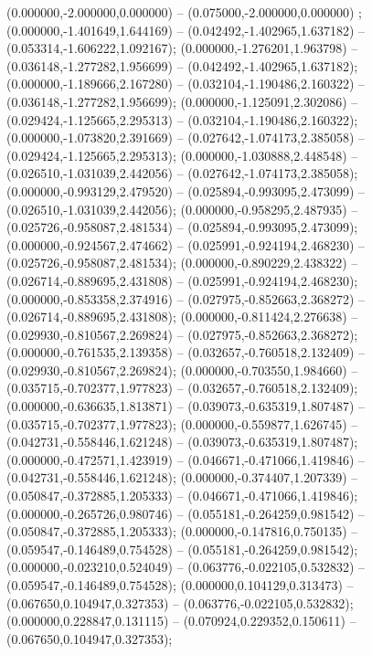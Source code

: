  (0.000000,-2.000000,0.000000) -- (0.075000,-2.000000,0.000000) ;
 (0.000000,-1.401649,1.644169) -- (0.042492,-1.402965,1.637182) -- (0.053314,-1.606222,1.092167);
 (0.000000,-1.276201,1.963798) -- (0.036148,-1.277282,1.956699) -- (0.042492,-1.402965,1.637182);
 (0.000000,-1.189666,2.167280) -- (0.032104,-1.190486,2.160322) -- (0.036148,-1.277282,1.956699);
 (0.000000,-1.125091,2.302086) -- (0.029424,-1.125665,2.295313) -- (0.032104,-1.190486,2.160322);
 (0.000000,-1.073820,2.391669) -- (0.027642,-1.074173,2.385058) -- (0.029424,-1.125665,2.295313);
 (0.000000,-1.030888,2.448548) -- (0.026510,-1.031039,2.442056) -- (0.027642,-1.074173,2.385058);
 (0.000000,-0.993129,2.479520) -- (0.025894,-0.993095,2.473099) -- (0.026510,-1.031039,2.442056);
 (0.000000,-0.958295,2.487935) -- (0.025726,-0.958087,2.481534) -- (0.025894,-0.993095,2.473099);
 (0.000000,-0.924567,2.474662) -- (0.025991,-0.924194,2.468230) -- (0.025726,-0.958087,2.481534);
 (0.000000,-0.890229,2.438322) -- (0.026714,-0.889695,2.431808) -- (0.025991,-0.924194,2.468230);
 (0.000000,-0.853358,2.374916) -- (0.027975,-0.852663,2.368272) -- (0.026714,-0.889695,2.431808);
 (0.000000,-0.811424,2.276638) -- (0.029930,-0.810567,2.269824) -- (0.027975,-0.852663,2.368272);
 (0.000000,-0.761535,2.139358) -- (0.032657,-0.760518,2.132409) -- (0.029930,-0.810567,2.269824);
 (0.000000,-0.703550,1.984660) -- (0.035715,-0.702377,1.977823) -- (0.032657,-0.760518,2.132409);
 (0.000000,-0.636635,1.813871) -- (0.039073,-0.635319,1.807487) -- (0.035715,-0.702377,1.977823);
 (0.000000,-0.559877,1.626745) -- (0.042731,-0.558446,1.621248) -- (0.039073,-0.635319,1.807487);
 (0.000000,-0.472571,1.423919) -- (0.046671,-0.471066,1.419846) -- (0.042731,-0.558446,1.621248);
 (0.000000,-0.374407,1.207339) -- (0.050847,-0.372885,1.205333) -- (0.046671,-0.471066,1.419846);
 (0.000000,-0.265726,0.980746) -- (0.055181,-0.264259,0.981542) -- (0.050847,-0.372885,1.205333);
 (0.000000,-0.147816,0.750135) -- (0.059547,-0.146489,0.754528) -- (0.055181,-0.264259,0.981542);
 (0.000000,-0.023210,0.524049) -- (0.063776,-0.022105,0.532832) -- (0.059547,-0.146489,0.754528);
 (0.000000,0.104129,0.313473) -- (0.067650,0.104947,0.327353) -- (0.063776,-0.022105,0.532832);
 (0.000000,0.228847,0.131115) -- (0.070924,0.229352,0.150611) -- (0.067650,0.104947,0.327353);

